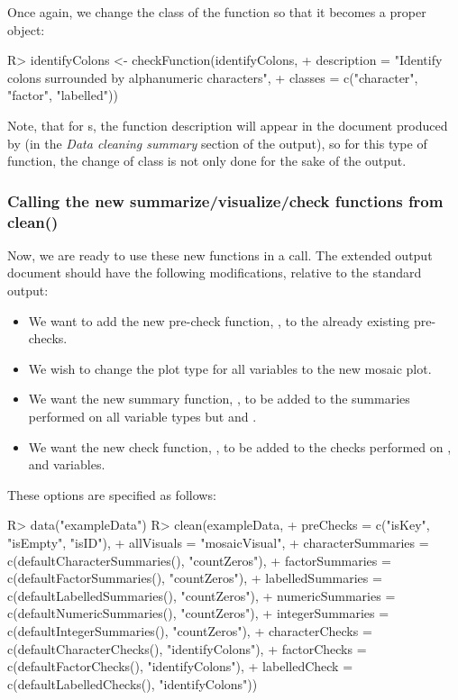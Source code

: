\documentclass[article,shortnames]{jss}
\begin{document}
Once again, we change the class of the function so that it becomes a proper  object: 

\begin{Schunk}
\begin{Sinput}
R> identifyColons <- checkFunction(identifyColons,
+      description = "Identify colons surrounded by alphanumeric characters",
+      classes = c("character", "factor", "labelled"))
\end{Sinput}
\end{Schunk}

Note, that for s, the function description will
appear in the document produced by  (in the \textit{Data
  cleaning summary} section of the output), so for this type of function, 
the change of class is not only done for the sake of the  output.

\subsubsection{Calling the new summarize/visualize/check functions from clean()}
Now, we are ready to use these new functions in a 
call. The extended  output document should have the
following modifications, relative to the standard  output:
\begin{itemize}
\item We want to add the new pre-check function, , to the already existing pre-checks.
\item We wish to change the plot type for all variables to the new mosaic plot.
\item We want the new summary function, , to be added to the summaries performed on all variable types but  and .
\item We want the new check function, , to be added to the checks performed on ,  and  variables.
\end{itemize}
These options are specified as follows: 
\begin{Schunk}
\begin{Sinput}
R> data("exampleData")
R> clean(exampleData,
+    preChecks = c("isKey", "isEmpty", "isID"),
+    allVisuals = "mosaicVisual",
+    characterSummaries = c(defaultCharacterSummaries(), "countZeros"),
+    factorSummaries = c(defaultFactorSummaries(), "countZeros"),
+    labelledSummaries = c(defaultLabelledSummaries(), "countZeros"),
+    numericSummaries = c(defaultNumericSummaries(), "countZeros"),
+    integerSummaries = c(defaultIntegerSummaries(), "countZeros"),
+    characterChecks = c(defaultCharacterChecks(), "identifyColons"),
+    factorChecks = c(defaultFactorChecks(), "identifyColons"),
+    labelledCheck = c(defaultLabelledChecks(), "identifyColons"))
\end{Sinput}
\end{Schunk}
\end{document}
